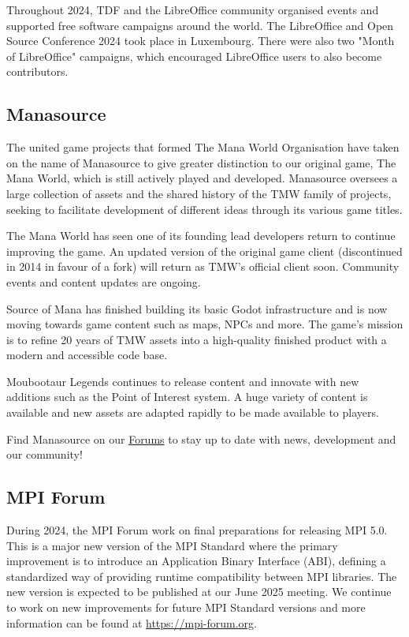 \documentclass[a4paper]{report}
\begin{document}
Throughout 2024, TDF and the LibreOffice community organised events and supported free software campaigns around the world. The LibreOffice and Open Source Conference 2024 took place in Luxembourg. There were also two "Month of LibreOffice" campaigns, which encouraged LibreOffice users to also become contributors.

\subsection{Manasource}

The united game projects that formed The Mana World Organisation have taken on the name of Manasource to give greater distinction to our original game, The Mana World, which is still actively played and developed. Manasource oversees a large collection of assets and the shared history of the TMW family of projects, seeking to facilitate development of different ideas through its various game titles.

The Mana World has seen one of its founding lead developers return to continue improving the game. An updated version of the original game client (discontinued in 2014 in favour of a fork) will return as TMW's official client soon. Community events and content updates are ongoing.

Source of Mana has finished building its basic Godot infrastructure and is now moving towards game content such as maps, NPCs and more. The game's mission is to refine 20 years of TMW assets into a high-quality finished product with a modern and accessible code base.

Moubootaur Legends continues to release content and innovate with new additions such as the Point of Interest system. A huge variety of content is available and new assets are adapted rapidly to be made available to players.

Find Manasource on our \href{https://forums.themanaworld.org/}{Forums} to stay up to date with news, development and our community!

\subsection{MPI Forum}

During 2024, the MPI Forum work on final preparations for releasing MPI 5.0. This is a major new version of the MPI Standard where the primary improvement is to introduce an Application Binary Interface (ABI), defining a standardized way of providing runtime compatibility between MPI libraries. The new version is expected to be published at our June 2025 meeting. We continue to work on new improvements for future MPI Standard versions and more information can be found at \href{https://mpi-forum.org}{https://mpi-forum.org}.
\end{document}
